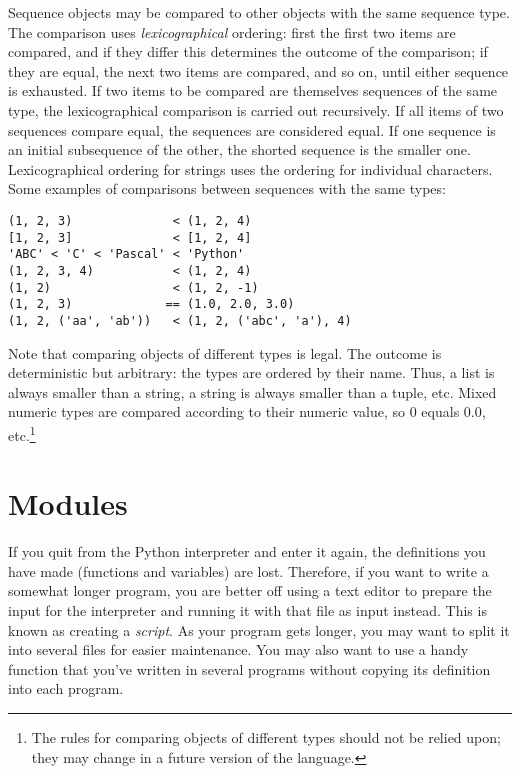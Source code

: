\documentclass{manual}
\begin{document}
Sequence objects may be compared to other objects with the same
sequence type.  The comparison uses \emph{lexicographical} ordering:
first the first two items are compared, and if they differ this
determines the outcome of the comparison; if they are equal, the next
two items are compared, and so on, until either sequence is exhausted.
If two items to be compared are themselves sequences of the same type,
the lexicographical comparison is carried out recursively.  If all
items of two sequences compare equal, the sequences are considered
equal.  If one sequence is an initial subsequence of the other, the
shorted sequence is the smaller one.  Lexicographical ordering for
strings uses the \ASCII{} ordering for individual characters.  Some
examples of comparisons between sequences with the same types:

\begin{verbatim}
(1, 2, 3)              < (1, 2, 4)
[1, 2, 3]              < [1, 2, 4]
'ABC' < 'C' < 'Pascal' < 'Python'
(1, 2, 3, 4)           < (1, 2, 4)
(1, 2)                 < (1, 2, -1)
(1, 2, 3)             == (1.0, 2.0, 3.0)
(1, 2, ('aa', 'ab'))   < (1, 2, ('abc', 'a'), 4)
\end{verbatim}

Note that comparing objects of different types is legal.  The outcome
is deterministic but arbitrary: the types are ordered by their name.
Thus, a list is always smaller than a string, a string is always
smaller than a tuple, etc.  Mixed numeric types are compared according
to their numeric value, so 0 equals 0.0, etc.\footnote{
        The rules for comparing objects of different types should
        not be relied upon; they may change in a future version of
        the language.
}


\chapter{Modules \label{modules}}

If you quit from the Python interpreter and enter it again, the
definitions you have made (functions and variables) are lost.
Therefore, if you want to write a somewhat longer program, you are
better off using a text editor to prepare the input for the interpreter
and running it with that file as input instead.  This is known as creating a
\emph{script}.  As your program gets longer, you may want to split it
into several files for easier maintenance.  You may also want to use a
handy function that you've written in several programs without copying
its definition into each program.
\end{document}
